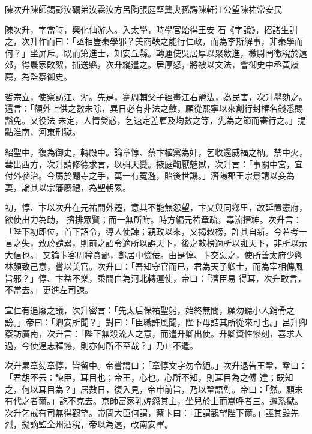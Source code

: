 
\begin{pinyinscope}

 陳次升陳師錫彭汝礪弟汝霖汝方呂陶張庭堅龔夬孫諤陳軒江公望陳祐常安民



 陳次升，字當時，興化仙游人。入太學，時學官始得王安
 石《字說》，招諸生訓之，次升作而曰：「丞相豈秦學邪？美商鞅之能行仁政，而為李斯解事，非秦學而何？」坐屏斥。既而第進士，知安丘縣。轉運使吳居厚以聚斂進，檄尉罔徵稅於遠郊，得農家敗絮，捕送縣，次升縱遣之。居厚怒，將被以文法，會御史中丞黃履薦，為監察御史。



 哲宗立，使察訪江、湖。先是，蹇周輔父子經畫江右鹽法，為民害，次升舉劾之。還言：「額外上供之數未除，異日必有非法之斂，願從熙寧以來創行封椿名錢悉賜豁免。又役法
 未定，人情熒惑，乞速定差雇及均數之等，先為之節而審行之。」提點淮南、河東刑獄。



 紹聖中，復為御史，轉殿中。論章惇、蔡卞植黨為奸，乞收還威福之柄。禁中火，彗出西方，次升請修德求言，以弭天變。掖庭鞫厭魅獄，次升言：「事關中宮，宜付外參治。今屬於閹寺之手，萬一有冤濫，貽後世譏。」濟陽郡王宗景請以妾為妻，論其以宗藩廢禮，為聖朝累。



 初，惇、卞以次升在元祐間外遷，意其不能無怨望，卞又與同鄉里，故延置憲府，欲使出力為助，
 擠排眾賢；而一無所附。時方編元祐章疏，毒流搢紳。次升言：「陛下初即位，首下詔令，導人使諫；親政以來，又揭敕榜，許其自新。今若考一言之失，致於譴累，則前之詔令適所以誤天下，後之敕榜適所以誑天下，非所以示大信也。」又論卞客周穜貪鄙，鄭居中憸佞。由是惇、卞交惡之，使所善太府少卿林顏致己意，嘗以美官。次升曰：「吾知守官而已，君為天子卿士，而為宰相傳風旨邪？」惇、卞益不樂，乘間白為河北轉運使，帝曰：「漕臣易
 得耳，次升敢言，不當去。」更進左司諫。



 宣仁有追廢之議，次升密言：「先太后保祐聖躬，始終無間，願勿聽小人銷骨之謗。」帝曰：「卿安所聞？」對曰：「臣職許風聞，陛下毋詰其所從來可也。」呂升卿察訪廣南，次升言：「陛下無殺流人之意，而遣升卿出使。升卿資性慘刻，喜求人過，今使逞志釋憾，則亦何所不至哉？」乃止不遣。



 次升累章劾章惇，皆留中。帝嘗謂曰：「章惇文字勿令絕。」次升退告王鞏，鞏曰：「君胡不云：諫臣，耳目也；帝王，心也。心所不知，則耳目為之傅
 達；既知之，何以耳目為？」居數日，復入見，帝申前旨，乃以鞏語對。帝曰：「然。顧未有代之者爾。」訖不克去。京師富家乳婢怨其主，坐兒於上而嵩呼者三。邏系獄。次升乞戒有司無得觀望。帝問大臣何謂，蔡卞曰：「正謂觀望陛下爾。」誣其毀先烈，擬謫監全州酒稅，帝以為遠，改南安軍。




\end{pinyinscope}
